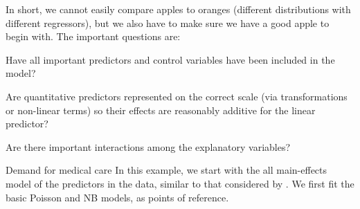 \documentclass[11pt]{book}\usepackage[]{graphicx}\usepackage[]{color}
\begin{document}
In short, we cannot easily compare apples
to oranges (different distributions with different regressors),
but we also have to make sure we have a good apple to begin with. The important questions are:
\begin{itemize*}
  \item Have all important predictors and control variables have been included in the model?
  \item Are quantitative predictors represented on the correct scale (via transformations or non-linear terms)
  so their effects are reasonably additive for the linear predictor?
  \item Are there important interactions among the explanatory variables?
\end{itemize*}


\begin{Example}[nmes2]{Demand for medical care}
In this example, we start with the all main-effects model of the predictors in the 
data, similar to that considered by \citet{Zeileis-etal:2008}.  We first fit the basic Poisson
and NB models, as points of reference.


\end{Example}
\end{document}
